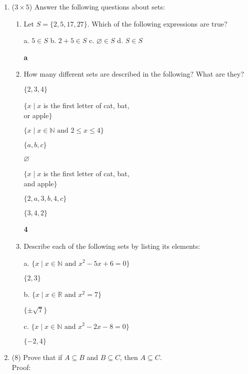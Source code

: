 \documentclass[12pt]{article}
\begin{document}
\begin{enumerate}


		\item ($3 \times 5$)
		Answer the following questions about sets:
		\begin{enumerate}
			\item
			Let $S = \{2, 5, 17, 27\}$. Which of the following expressions are true?

			a. $5 \in S$ \quad\quad b. $2 + 5 \in S$ \quad\quad c. $\varnothing \in S$ \quad\quad d. $S \in S$

			\textbf{a}

			\item
			How many different sets are described  in the following? What are they?
			\begin{multicols}{2}
				$\{2, 3, 4\} $

				\hangindent=1cm $\{x \mid x$ is the first letter of cat, bat, \\or apple$\}$

				$\{x \mid x \in \mathbb{N} \text{ and } 2 \leq x \leq 4\}$

				$\{a, b, c\}$

				$\varnothing $

				\hangindent=1cm $\{x \mid x$ is the first letter of cat, bat, \\and apple$\}$

				$\{2, a, 3, b, 4, c\}$

				$\{3, 4, 2\}$
			\end{multicols}

			\textbf{4}
			\item
			Describe each of the following sets by listing its elements:

			a. $\{x \mid x \in \mathbb{N} \text{ and } x^2 -5x +6 = 0\}$

			$\{2, 3\}$

			b. $\{x \mid x \in \mathbb{R} \text{ and } x^2 = 7\}$

			$\{\pm\sqrt{7}\}$

			c. $\{x \mid x \in \mathbb{N} \text{ and } x^2 -2x -8 = 0\}$

			$\{-2, 4\}$
			\clearpage
		\end{enumerate}


		\item ($8$)	Prove that if $A \subseteq B$ and $B \subseteq C$, then $A \subseteq C$.
		\\Proof:


\end{enumerate}
\end{document}
